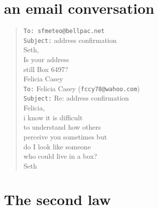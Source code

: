 \documentclass[times,12pt]{book}
\begin{document}
\section*{an email conversation}
\begin{verse}
\texttt{To: sfmeteo@bellpac.net}\\
\texttt{Subject:} address confirmation\\[8pt]
Seth,\\
Is your address\\
still Box 6497?\\[5pt]
Felicia Casey\\[2cm]

\texttt{To:} Felicia Casey (\texttt{fccy78@wahoo.com})\\
\texttt{Subject:} Re: address confirmation\\[8pt]

Felicia,\\
i know it is difficult\\
to understand how others\\
perceive you sometimes but\\
do I look like someone\\
who could live in a box?\\[5pt]
Seth\\
\end{verse}
\newpage

\section*{The second law}
\end{document}

